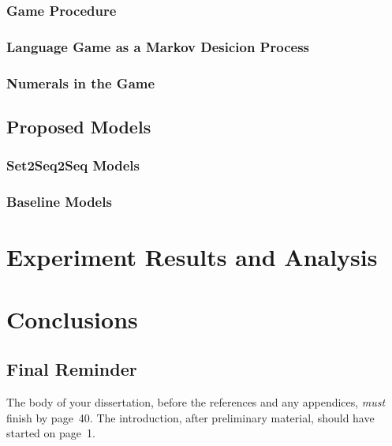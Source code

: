 \documentclass[msc,deptreport]{infthesis} %
\begin{document}
\subsection{Game Procedure}
\label{ssec3.1.1:game_procedure}

\subsection{Language Game as a Markov Desicion Process}
\label{ssec3.1.2:game_mdp}

\subsection{Numerals in the Game}
\label{ssec3.1.3:numeral_in_game}

\section{Proposed Models}
\label{sec3.2:models}

\subsection{Set2Seq2Seq Models}
\label{ssec3.2.1:set2seq2seq}

\subsection{Baseline Models}
\label{ssec3.2.2:baselines}


\chapter{Experiment Results and Analysis}
\label{ch4:results_analysis}


\chapter{Conclusions}
\label{ch5:conclusion}

\section{Final Reminder}

The body of your dissertation, before the references and any appendices,
\emph{must} finish by page~40. The introduction, after preliminary material,
should have started on page~1.
\end{document}
